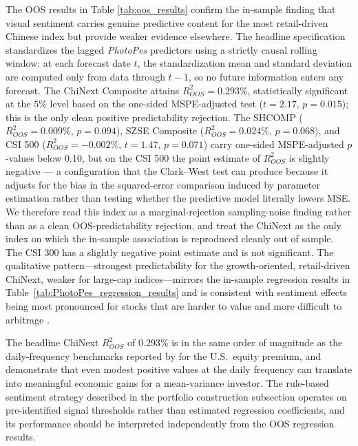 \documentclass[AER]{AEA}
\begin{document}
The OOS results in Table \ref{tab:oos_results} confirm the in-sample finding that visual sentiment carries genuine predictive content for the most retail-driven Chinese index but provide weaker evidence elsewhere. The headline specification standardizes the lagged \textit{PhotoPes} predictors using a strictly causal rolling window: at each forecast date $t$, the standardization mean and standard deviation are computed only from data through $t-1$, so no future information enters any forecast. The ChiNext Composite attains $R^2_{OOS} = 0.293\%$, statistically significant at the $5\%$ level based on the one-sided MSPE-adjusted test ($t = 2.17$, $p = 0.015$); this is the only clean positive predictability rejection. The SHCOMP ($R^2_{OOS} = 0.009\%$, $p=0.094$), SZSE Composite ($R^2_{OOS} = 0.024\%$, $p=0.068$), and CSI 500 ($R^2_{OOS}=-0.002\%$, $t=1.47$, $p=0.071$) carry one-sided MSPE-adjusted $p$-values below 0.10, but on the CSI 500 the point estimate of $R^2_{OOS}$ is slightly negative --- a configuration that the Clark--West test can produce because it adjusts for the bias in the squared-error comparison induced by parameter estimation rather than testing whether the predictive model literally lowers MSE. We therefore read this index as a marginal-rejection sampling-noise finding rather than as a clean OOS-predictability rejection, and treat the ChiNext as the only index on which the in-sample association is reproduced cleanly out of sample. The CSI 300 has a slightly negative point estimate and is not significant. The qualitative pattern---strongest predictability for the growth-oriented, retail-driven ChiNext, weaker for large-cap indices---mirrors the in-sample regression results in Table~\ref{tab:PhotoPes_regression_results} and is consistent with sentiment effects being most pronounced for stocks that are harder to value and more difficult to arbitrage \citep{baker2007investor,stambaugh2012short}.

The headline ChiNext $R^2_{OOS}$ of 0.293\% is in the same order of magnitude as the daily-frequency benchmarks reported by \citet{rapach2010out} for the U.S.\ equity premium, and \citet{campbell2008predicting} demonstrate that even modest positive values at the daily frequency can translate into meaningful economic gains for a mean-variance investor. The rule-based sentiment strategy described in the portfolio construction subsection operates on pre-identified signal thresholds rather than estimated regression coefficients, and its performance should be interpreted independently from the OOS regression results.
\end{document}
